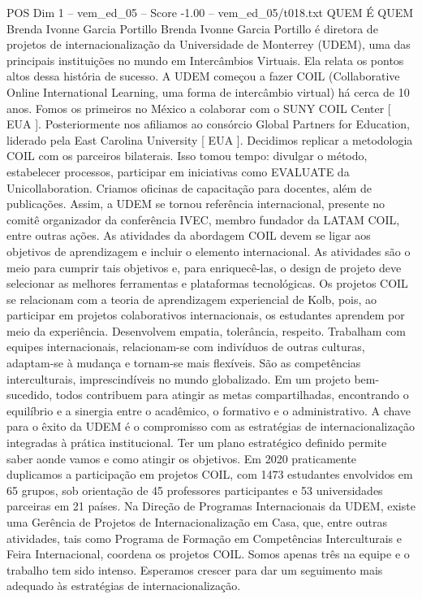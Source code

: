 \begin{textsample}{POS Dim 1 – vem\_ed\_05 – Score -1.00 – vem\_ed\_05/t018.txt}  \label{ex:f1_pos_086}
QUEM É QUEM Brenda Ivonne Garcia Portillo Brenda Ivonne Garcia Portillo é diretora de projetos de internacionalização da Universidade de Monterrey (UDEM), uma das principais instituições no mundo em Intercâmbios Virtuais.
Ela relata os pontos altos dessa história de sucesso.
A UDEM começou a fazer COIL (Collaborative Online International Learning, uma forma de intercâmbio virtual) há cerca de 10 anos.
Fomos os primeiros no México a colaborar com o SUNY COIL Center [ EUA ].
Posteriormente nos afiliamos ao consórcio Global Partners for Education, liderado pela East Carolina University [ EUA ].
Decidimos replicar a metodologia COIL com os parceiros bilaterais.
Isso tomou tempo: divulgar o método, estabelecer processos, participar em iniciativas como EVALUATE da Unicollaboration.
Criamos oficinas de capacitação para docentes, além de publicações.
Assim, a UDEM se tornou referência internacional, presente no comitê organizador da conferência IVEC, membro fundador da LATAM COIL, entre outras ações.
As atividades da abordagem COIL devem se ligar aos objetivos de aprendizagem e incluir o elemento internacional.
As atividades são o meio para cumprir tais objetivos e, para enriquecê-las, o design de projeto deve selecionar as melhores ferramentas e plataformas tecnológicas.
Os projetos COIL se relacionam com a teoria de aprendizagem experiencial de Kolb, pois, ao participar em projetos colaborativos internacionais, os estudantes aprendem por meio da experiência.
Desenvolvem empatia, tolerância, respeito.
Trabalham com equipes internacionais, relacionam-se com indivíduos de outras culturas, adaptam-se à mudança e tornam-se mais flexíveis.
São as competências interculturais, imprescindíveis no mundo globalizado.
Em um projeto bem-sucedido, todos contribuem para atingir as metas compartilhadas, encontrando o equilíbrio e a sinergia entre o acadêmico, o formativo e o administrativo.
A chave para o êxito da UDEM é o compromisso com as estratégias de internacionalização integradas à prática institucional.
Ter um plano estratégico definido permite saber aonde vamos e como atingir os objetivos.
Em 2020 praticamente duplicamos a participação em projetos COIL, com 1473 estudantes envolvidos em 65 grupos, sob orientação de 45 professores participantes e 53 universidades parceiras em 21 países.
Na Direção de Programas Internacionais da UDEM, existe uma Gerência de Projetos de Internacionalização em Casa, que, entre outras atividades, tais como Programa de Formação em Competências Interculturais e Feira Internacional, coordena os projetos COIL.
Somos apenas três na equipe e o trabalho tem sido intenso.
Esperamos crescer para dar um seguimento mais adequado às estratégias de internacionalização.

\end{textsample}

